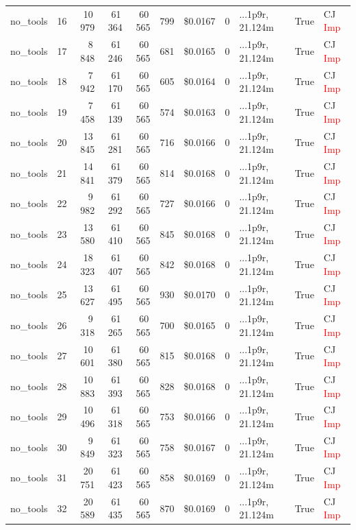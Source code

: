 \documentclass[a4paper,11pt]{article}
\begin{document}
\begin{table}[H]
{\begin{tabular}{l r r r r r r r l r l}
no\_tools & 16 & 10\,979 & 61\,364 & 60\,565 & 799 & \$0.0167 & 0 & ...1p9r, 21.124m & True & CJ \textcolor{red}{Imp} \\
no\_tools & 17 & 8\,848 & 61\,246 & 60\,565 & 681 & \$0.0165 & 0 & ...1p9r, 21.124m & True & CJ \textcolor{red}{Imp} \\
no\_tools & 18 & 7\,942 & 61\,170 & 60\,565 & 605 & \$0.0164 & 0 & ...1p9r, 21.124m & True & CJ \textcolor{red}{Imp} \\
no\_tools & 19 & 7\,458 & 61\,139 & 60\,565 & 574 & \$0.0163 & 0 & ...1p9r, 21.124m & True & CJ \textcolor{red}{Imp} \\
no\_tools & 20 & 13\,845 & 61\,281 & 60\,565 & 716 & \$0.0166 & 0 & ...1p9r, 21.124m & True & CJ \textcolor{red}{Imp} \\
no\_tools & 21 & 14\,841 & 61\,379 & 60\,565 & 814 & \$0.0168 & 0 & ...1p9r, 21.124m & True & CJ \textcolor{red}{Imp} \\
no\_tools & 22 & 9\,982 & 61\,292 & 60\,565 & 727 & \$0.0166 & 0 & ...1p9r, 21.124m & True & CJ \textcolor{red}{Imp} \\
no\_tools & 23 & 13\,580 & 61\,410 & 60\,565 & 845 & \$0.0168 & 0 & ...1p9r, 21.124m & True & CJ \textcolor{red}{Imp} \\
no\_tools & 24 & 18\,323 & 61\,407 & 60\,565 & 842 & \$0.0168 & 0 & ...1p9r, 21.124m & True & CJ \textcolor{red}{Imp} \\
no\_tools & 25 & 13\,627 & 61\,495 & 60\,565 & 930 & \$0.0170 & 0 & ...1p9r, 21.124m & True & CJ \textcolor{red}{Imp} \\
no\_tools & 26 & 9\,318 & 61\,265 & 60\,565 & 700 & \$0.0165 & 0 & ...1p9r, 21.124m & True & CJ \textcolor{red}{Imp} \\
no\_tools & 27 & 10\,601 & 61\,380 & 60\,565 & 815 & \$0.0168 & 0 & ...1p9r, 21.124m & True & CJ \textcolor{red}{Imp} \\
no\_tools & 28 & 10\,883 & 61\,393 & 60\,565 & 828 & \$0.0168 & 0 & ...1p9r, 21.124m & True & CJ \textcolor{red}{Imp} \\
no\_tools & 29 & 10\,496 & 61\,318 & 60\,565 & 753 & \$0.0166 & 0 & ...1p9r, 21.124m & True & CJ \textcolor{red}{Imp} \\
no\_tools & 30 & 9\,849 & 61\,323 & 60\,565 & 758 & \$0.0167 & 0 & ...1p9r, 21.124m & True & CJ \textcolor{red}{Imp} \\
no\_tools & 31 & 20\,751 & 61\,423 & 60\,565 & 858 & \$0.0169 & 0 & ...1p9r, 21.124m & True & CJ \textcolor{red}{Imp} \\
no\_tools & 32 & 20\,589 & 61\,435 & 60\,565 & 870 & \$0.0169 & 0 & ...1p9r, 21.124m & True & CJ \textcolor{red}{Imp} \\

\end{tabular}}
\end{table}
\end{document}
